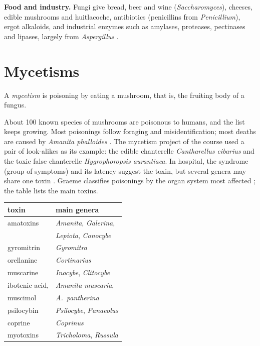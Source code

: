 \textbf{Food and industry.}
Fungi give bread, beer and wine
(\emph{Saccharomyces}), cheeses, edible
mushrooms and huitlacoche, antibiotics
(penicillins from \emph{Penicillium}),
ergot alkaloids, and industrial enzymes such
as amylases, proteases, pectinases and
lipases, largely from \emph{Aspergillus}
\cite[Chapter 1]{deacon2006fungal}.

\section{Mycetisms}
\label{section-mycetisms}

\begin{definition}
\label{definition-mycetism}
A \emph{mycetism} is poisoning by eating a
mushroom, that is, the fruiting body of a
fungus.
\end{definition}

About 100 known species of mushrooms are
poisonous to humans, and the list keeps
growing. Most poisonings follow foraging and
misidentification; most deaths are caused by
\emph{Amanita phalloides}
\cite{graeme2014mycetism}. The mycetism
project of the course used a pair of
look-alikes as its example: the edible
chanterelle \emph{Cantharellus cibarius} and
the toxic false chanterelle
\emph{Hygrophoropsis aurantiaca}. In
hospital, the syndrome (group of symptoms)
and its latency suggest the toxin, but
several genera may share one toxin
\cite[pp.~106--113]{hall2003edible}. Graeme
classifies poisonings by the organ system
most affected \cite{graeme2014mycetism}; the
table lists the main toxins.

\begin{center}
\begin{tabular}{ll}
toxin & main genera \\
\hline
amatoxins & \emph{Amanita},
\emph{Galerina}, \\
 & \emph{Lepiota}, \emph{Conocybe} \\
gyromitrin & \emph{Gyromitra} \\
orellanine & \emph{Cortinarius} \\
muscarine & \emph{Inocybe},
\emph{Clitocybe} \\
ibotenic acid, & \emph{Amanita muscaria},
\\
muscimol & \emph{A.\ pantherina} \\
psilocybin & \emph{Psilocybe},
\emph{Panaeolus} \\
coprine & \emph{Coprinus} \\
myotoxins & \emph{Tricholoma},
\emph{Russula} \\
\end{tabular}
\end{center}

